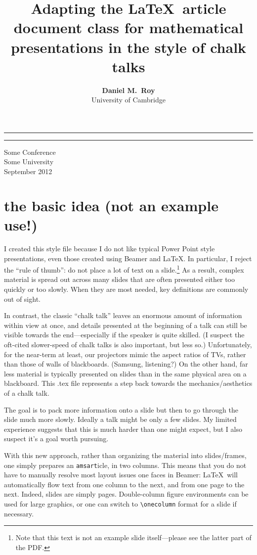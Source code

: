 \documentclass[reqno,oneside,twocolumn,10pt]{amsart}
\title[\LaTeX\ for Chalk Talks] %
{\LARGE Adapting the \LaTeX\ article document class for mathematical 
presentations in the style of chalk talks
}
\author[Daniel Roy]
{{\huge \bf Daniel M.~Roy}\\University of Cambridge}
\theoremstyle{definition}
\theoremstyle{remark}
\begin{document}
\onecolumn
\hrule
\vspace{4em}
\maketitle
\hrule
\vfill
\begin{center}
\sc Some Conference\\Some University\\September 2012
\end{center}

\clearpage

\twocolumn

\section{the basic idea (not an example use!)}

I created this style file because I do not like typical Power Point style presentations, even those created using Beamer and \LaTeX.  In particular, I reject the ``rule of thumb'': do not place a lot of text on a slide.\footnote{Note that this text is not an example slide itself---please see the latter part of the PDF.} As a result, complex material is spread out across many slides that are often presented either too quickly or too slowly.  When they are most needed, key definitions are commonly out of sight.

In contrast, the classic ``chalk talk'' leaves an enormous amount of information within view at once, and details presented at the beginning of a talk can still be visible towards the end---especially if the speaker is quite skilled. (I suspect the oft-cited slower-speed of chalk talks is also important, but less so.)  Unfortunately, for the near-term at least, our projectors mimic the aspect ratios of TVs, rather than those of walls of blackboards.  (Samsung, listening?)  On the other hand, far less material is typically presented on slides than in the same physical area on a blackboard.  This .tex file represents a step back towards the mechanics/aesthetics of a chalk talk.

The goal is to pack more information onto a slide but then to go through the slide much more slowly.  Ideally a talk might be only a few slides.  My limited experience suggests that this is much harder than one might expect, but I also suspect it's a goal worth pursuing.

With this new approach, rather than organizing the material into slides/frames, one simply prepares an {\tt amsart}icle, in two columns.  This means that you do not have to manually resolve most layout issues one faces in Beamer: \LaTeX\ will automatically flow text from one column to the next, and from one page to the next.  Indeed, slides are simply pages. Double-column figure environments can be used for large graphics, or one can switch to {\tt \textbackslash onecolumn} format for a slide if necessary.  
\end{document}

